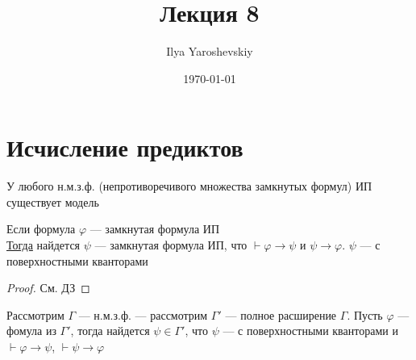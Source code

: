 \documentclass[english]{article}
\author{Ilya Yaroshevskiy}
\date{\today}
\title{Лекция 8}
\begin{document}
\maketitle
\tableofcontents


\section{Исчисление предиктов}
\label{sec:orge179daa}
\begin{theorem}
	У любого н.м.з.ф. (непротиворечивого множества замкнутых формул) ИП существует модель
	\label{org41fb36b}
\end{theorem}
\begin{theorem}
	Если формула \(\varphi\) --- замкнутая формула ИП \\
	\uline{Тогда} найдется \(\psi\) --- замкнутая формула ИП, что \(\vdash \varphi \to \psi\) и \(\psi \to \varphi\). \(\psi\) --- с поверхностными кванторами
\end{theorem}
\begin{proof}
	См. ДЗ
\end{proof}
\begin{remark}
	Рассмотрим \(\Gamma\) --- н.м.з.ф. --- рассмотрим \(\Gamma'\) --- полное расширение \(\Gamma\). Пусть \(\varphi\) --- фомула из \(\Gamma'\), тогда найдется \(\psi \in \Gamma'\), что \(\psi\) --- с поверхностными кванторами и \(\vdash \varphi \to \psi\), \(\vdash \psi \to \varphi\)
\end{remark}
\end{document}
